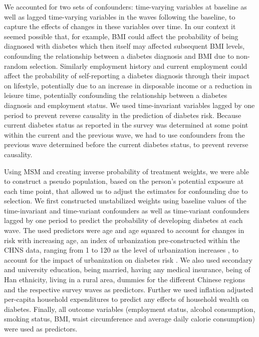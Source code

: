 We accounted for two sets of confounders: time-varying variables at baseline as well as lagged time-varying variables in the waves following the baseline, to capture the effects of changes in these variables over time. In our context it seemed possible that, for example, \ac{BMI} could affect the probability of being diagnosed with diabetes which then itself may affected subsequent \ac{BMI} levels, confounding the relationship between a diabetes diagnosis and \ac{BMI} due to non-random selection. Similarly  employment history and current employment could affect the probability of self-reporting a diabetes diagnosis through their impact on lifestyle, potentially due to an increase in disposable income or a reduction in leisure time, potentially confounding the relationship between a diabetes diagnosis and employment status. We used time-invariant variables lagged by one period to prevent reverse causality in the prediction of diabetes risk. Because current diabetes status as reported in the survey was determined at some point within the current and the previous wave, we had to use confounders from the previous wave determined before the current diabetes status, to prevent reverse causality.

Using \ac{MSM} and creating inverse probability of treatment weights, we were able to construct a pseudo population, based on the person's potential exposure at each time point, that allowed us to adjust the estimates for confounding due to selection. We first constructed unstabilized weights using baseline values of the time-invariant and time-variant confounders as well as time-variant confounders lagged by one period to predict the probability of developing diabetes at each wave. The used predictors were age and age squared to account for changes in risk with increasing age, an index of urbanization pre-constructed within the \ac{CHNS} data, ranging from 1 to 120 as the level of urbanization increases \parencite{Zhang2014d}, to account for the impact of urbanization on diabetes risk \parencite{Attard2012}. We also used secondary and university education, being married, having any medical insurance, being of Han ethnicity, living in a rural area, dummies for the different Chinese regions and the respective survey waves as predictors. Further we used inflation adjusted per-capita household expenditures to predict any effects of household wealth on diabetes. Finally, all outcome variables (employment status, alcohol consumption, smoking status, \ac{BMI}, waist circumference and average daily calorie consumption) were used as predictors. 

